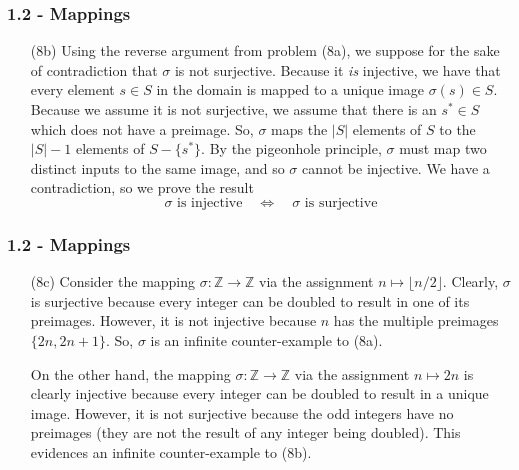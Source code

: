 \documentclass{beamer}
\begin{document}
\begin{frame}
\frametitle{1.2 - Mappings}
\small
\begin{enumerate}
	\item[(8b)] Using the reverse argument from problem (8a), we suppose for the sake of contradiction that $\sigma$ is not surjective. Because it \textit{is} injective, we have that every element $s\in S$ in the domain is mapped to a unique image $\sigma(s)\in S$. Because we assume it is not surjective, we assume that there is an $s^*\in S$ which does not have a preimage. So, $\sigma$ maps the $|S|$ elements of $S$ to the $|S| - 1$ elements of $S - \{s^*\}$. By the pigeonhole principle, $\sigma$ must map two distinct inputs to the same image, and so $\sigma$ cannot be injective. We have a contradiction, so we prove the result
	\begin{equation*}	
	\sigma\text{ is injective}\quad\Leftrightarrow\quad\sigma\text{ is surjective}
	\end{equation*}
\end{enumerate}
\end{frame}
\begin{frame}
\frametitle{1.2 - Mappings}
\small
\begin{enumerate}
	\item[(8c)] \quad Consider the mapping $\sigma: \mathbb Z\to\mathbb Z$ via the assignment $n\mapsto \lfloor n / 2\rfloor$. Clearly, $\sigma$ is surjective because every integer can be doubled to result in one of its preimages. However, it is not injective because $n$ has the multiple preimages $\{2n, 2n+1\}$. So, $\sigma$ is an infinite counter-example to (8a).
	
	\quad On the other hand, the mapping $\sigma: \mathbb Z \to \mathbb Z$ via the assignment $n\mapsto 2n$ is clearly injective because every integer can be doubled to result in a unique image. However, it is not surjective because the odd integers have no preimages (they are not the result of any integer being doubled). This evidences an infinite counter-example to (8b).
\end{enumerate}
\end{frame}
\end{document}
